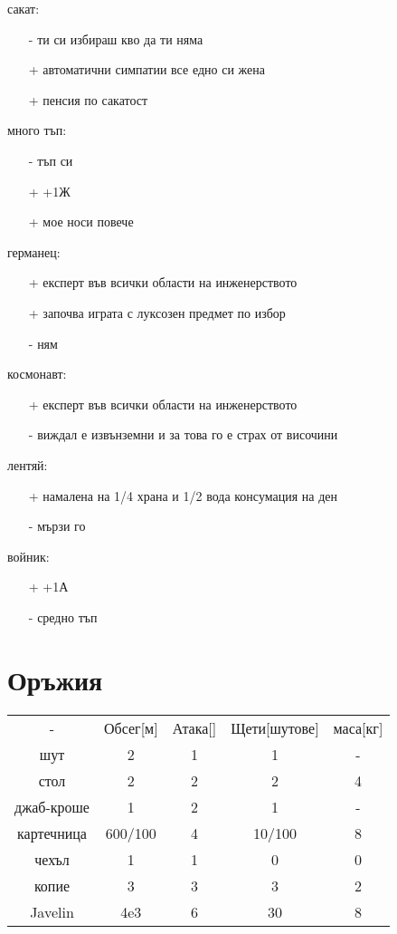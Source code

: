 \documentclass{article}
\begin{document}
сакат:
\begin{itemize}
\item[-] ти си избираш кво да ти няма
\item[+] автоматични симпатии все едно си жена
\item[+] пенсия по сакатост
\end{itemize}

много тъп:
\begin{itemize}
\item[-] тъп си
\item[+] +1Ж
\item[+] мое носи повече
\end{itemize}

германец:
\begin{itemize}
\item[+] експерт във всички области на инженерството
\item[+] започва играта с луксозен предмет по избор
\item[-] ням
\end{itemize}

космонавт:
\begin{itemize}
\item[+] експерт във всички области на инженерството
\item[-] виждал е извънземни и за това го е страх от височини
\end{itemize}

лентяй:
\begin{itemize}
\item[+] намалена на 1/4 храна и 1/2 вода консумация на ден
\item[-] мързи го
\end{itemize}

войник:
\begin{itemize}
\item[+] +1А
\item[-] средно тъп
\end{itemize}


\section{Оръжия}
\begin{tabular}{c | c| c | c | c}
- & Обсег[м] & Атака[]  & Щети[шутове] & маса[кг]  \\

шут & 2 & 1 & 1 & - \\
стол & 2 & 2 & 2 & 4  \\
джаб-кроше & 1 & 2 & 1 & - \\
картечница & 600/100 & 4 & 10/100 & 8\footnotemark  \\
чехъл & 1 & 1 & 0 & 0  \\
копие & 3 & 3 & 3 & 2  \\
Javelin & 4e3 & 6 & 30\footnotemark & 8 \\
\end{tabular}
\end{document}

